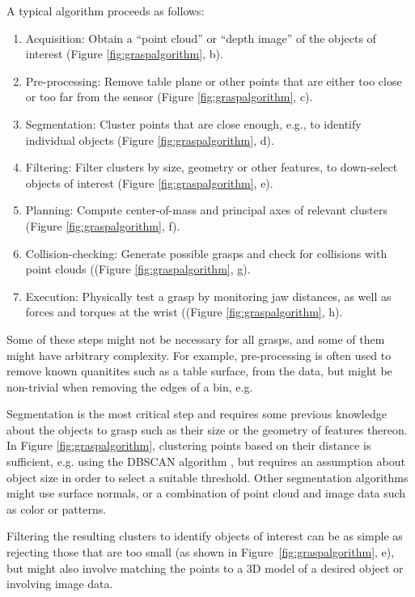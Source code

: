 A typical algorithm proceeds as follows:
\begin{enumerate}
\item Acquisition: Obtain a ``point cloud'' or ``depth image'' of the objects of interest (Figure \ref{fig:graspalgorithm}, b).
\item Pre-processing: Remove table plane or other points that are either too close or too far from the sensor (Figure \ref{fig:graspalgorithm}, c).
\item Segmentation: Cluster points that are close enough, e.g., to identify individual objects (Figure \ref{fig:graspalgorithm}, d).
\item Filtering: Filter clusters by size, geometry or other features, to down-select objects of interest (Figure \ref{fig:graspalgorithm}, e).
\item Planning: Compute center-of-mass and principal axes of relevant clusters (Figure \ref{fig:graspalgorithm}, f).
\item Collision-checking: Generate possible grasps and check for collisions with point clouds ((Figure \ref{fig:graspalgorithm}, g).
\item Execution: Physically test a grasp by monitoring jaw distances, as well as forces and torques at the wrist ((Figure \ref{fig:graspalgorithm}, h).
\end{enumerate}

Some of these steps might not be necessary for all grasps, and some of them might have arbitrary complexity. For example, pre-processing is often used to remove known quanitites such as a table surface, from the data, but might be non-trivial when removing the edges of a bin, e.g. 

Segmentation is the most critical step and requires some previous knowledge about the objects to grasp such as their size or the geometry of features thereon. In Figure \ref{fig:graspalgorithm}, clustering points based on their distance is sufficient, e.g. using the DBSCAN algorithm \cite{ester1996density}, but requires an assumption about object size in order to select a suitable threshold. Other segmentation algorithms might use surface normals, or a combination of point cloud and image data such as color or patterns. 

Filtering the resulting clusters to identify objects of interest can be as simple as rejecting those that are too small (as shown in Figure~\ref{fig:graspalgorithm}, e), but might also involve matching the points to a 3D model of a desired object or involving image data. 

